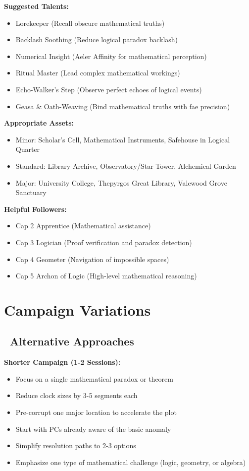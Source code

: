 \documentclass[11pt]{article}
\begin{document}
\textbf{Suggested Talents:}
\begin{itemize}
    \item Lorekeeper (Recall obscure mathematical truths)
    \item Backlash Soothing (Reduce logical paradox backlash)
    \item Numerical Insight (Aeler Affinity for mathematical perception)
    \item Ritual Master (Lead complex mathematical workings)
    \item Echo-Walker's Step (Observe perfect echoes of logical events)
    \item Geasa & Oath-Weaving (Bind mathematical truths with fae precision)
\end{itemize}

\textbf{Appropriate Assets:}
\begin{itemize}
    \item Minor: Scholar's Cell, Mathematical Instruments, Safehouse in Logical Quarter
    \item Standard: Library Archive, Observatory/Star Tower, Alchemical Garden
    \item Major: University College, Thepyrgos Great Library, Valewood Grove Sanctuary
\end{itemize}

\textbf{Helpful Followers:}
\begin{itemize}
    \item Cap 2 Apprentice (Mathematical assistance)
    \item Cap 3 Logician (Proof verification and paradox detection)
    \item Cap 4 Geometer (Navigation of impossible spaces)
    \item Cap 5 Archon of Logic (High-level mathematical reasoning)
\end{itemize}

\section{Campaign Variations}

\subsection*{\faRandom\ Alternative Approaches}

\textbf{Shorter Campaign (1-2 Sessions):}
\begin{itemize}
    \item Focus on a single mathematical paradox or theorem
    \item Reduce clock sizes by 3-5 segments each
    \item Pre-corrupt one major location to accelerate the plot
    \item Start with PCs already aware of the basic anomaly
    \item Simplify resolution paths to 2-3 options
    \item Emphasize one type of mathematical challenge (logic, geometry, or algebra)
\end{itemize}
\end{document}
